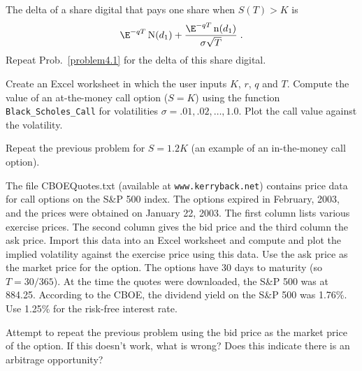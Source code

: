 \begin{prob} The delta of a share digital that pays one share when $S(T)>K$ is 
$$\E^{-qT}\N(d_1) + \frac{\E^{-qT}\nd(d_1)}{\sigma \sqrt{T}}\; .$$
Repeat Prob.~\ref{problem4.1} for the delta of this share digital.
\end{prob}\begin{prob} Create an Excel worksheet in which the user inputs $K$, $r$, $q$ and $T$.  Compute the value of an at-the-money call option ($S=K$) using the function  \verb!Black_Scholes_Call! for volatilities $\sigma = .01, .02, \ldots, 1.0$.  Plot the call value against the volatility.
\end{prob}\begin{prob} Repeat the previous problem for  $S=1.2K$ (an example of an in-the-money call option).
\end{prob}\begin{prob} The file CBOEQuotes.txt (available at \verb!www.kerryback.net!) contains price data for call options on the S\&P 500 index.  The options expired in February, 2003, and the prices were obtained on January 22, 2003.  The first column lists various exercise prices.  The second column gives the bid price and the third column the ask price.  Import this data into an Excel worksheet and compute and plot the implied volatility against the exercise price using this data.  Use the ask price as the market price for the option.    The options have 30 days to maturity (so $T=30/365$).  At the time the quotes were downloaded, the S\&P 500 was at 884.25.  According to the CBOE, the dividend yield on the S\&P 500 was 1.76\%.  Use 1.25\% for the risk-free interest rate.  

\end{prob}\begin{prob} Attempt to repeat the previous problem using the bid price as the market price of the option.  If this doesn't work, what is wrong?  Does this indicate there is an arbitrage opportunity?


\end{prob}
